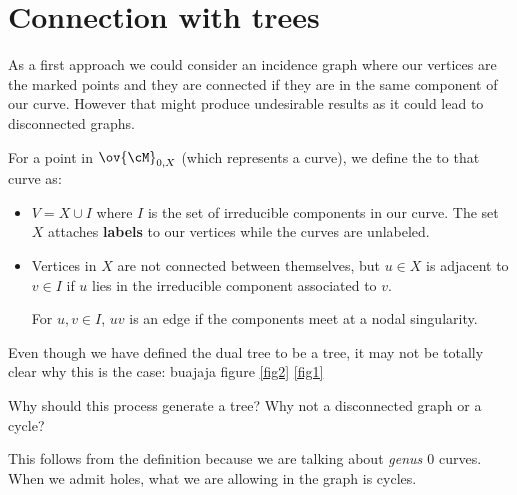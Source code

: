 \documentclass[12pt]{memoir}
\begin{document}
\section{Connection with trees}

As a first approach we could consider an incidence graph where our vertices are the marked points and they are connected if they are in the same component of our curve. However that might produce undesirable results as it could lead to disconnected graphs.

\begin{Def}
For a point in $\ov{\cM}_{0,X}$ (which represents a curve), we define the  to that curve as:
\begin{itemize}
    \item $V=X\cup I$ where $I$ is the set of irreducible components in our curve. The set $X$ attaches \textbf{labels} to our vertices while the curves are unlabeled.
    \item Vertices in $X$ are not connected between themselves, but $u\in X$ is adjacent to $v\in I$ if $u$ lies in the irreducible component associated to $v$.\par 
    For $u,v\in I$, $uv$ is an edge if the components meet at a nodal singularity.
\end{itemize}
\end{Def}

Even though we have defined the dual tree to be a tree, it may not be totally clear why this is the case: buajaja figure \ref{fig2} \ref{fig1}
\begin{significant}
    Why should this process generate a tree? Why not a disconnected graph or a cycle?
\end{significant}
This follows from the definition because we are talking about \emph{genus $0$} curves. When we admit holes, what we are allowing in the graph is cycles.
\end{document}
